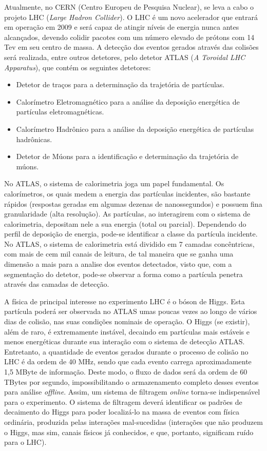 Atualmente, no CERN (Centro Europeu de Pesquisa Nuclear), se leva a cabo o projeto LHC (\emph{Large Hadron Collider}). O LHC é um novo acelerador que entrará em operação em 2009 e será capaz de atingir níveis de energia nunca antes alcançados, devendo colidir pacotes com um número elevado de prótons com 14 Tev em seu centro de massa. A detecção dos eventos gerados através das colisões será realizada, entre outros detetores, pelo detetor ATLAS (\emph{A Toroidal LHC Apparatus}), que contém os seguintes detetores:
 
\begin{itemize}

\item Detetor de traços para a determinação da trajetória de partículas.
\item Calorímetro Eletromagnético para a análise da deposição energética de partículas eletromagnéticas.
\item Calorímetro Hadrônico para a análise da deposição energética de partículas hadrônicas.
\item Detetor de Múons para a identificação e determinação da trajetória de múons.

\end{itemize}
 
No ATLAS, o sistema de calorimetria joga um papel fundamental. Os calorímetros, os quais medem a energia das partículas incidentes, são bastante rápidos (respostas geradas em algumas dezenas de nanossegundos) e possuem fina granularidade (alta resolução). As partículas, ao interagirem com o sistema de calorimetria, depositam nele a sua energia (total ou parcial). Dependendo do perfil de deposição de energia, pode-se identificar a classe da partícula incidente. No ATLAS, o sistema de calorimetria está dividido em 7 camadas concêntricas, com mais de cem mil canais de leitura, de tal maneira que se ganha uma dimensão a mais para a analise dos eventos detectados, visto que, com a segmentação do detetor, pode-se observar a forma como a partícula penetra através das camadas de detecção.

A física de principal interesse no experimento LHC é o bóson de Higgs. Esta partícula poderá ser observada no ATLAS umas poucas vezes ao longo de vários dias de colisão, nas suas condições nominais de operação. O Higgs (se existir), além de raro, é extremamente instável, decaindo em partículas mais estáveis e menos energéticas durante sua interação com o sistema de detecção ATLAS. Entretanto, a quantidade de eventos gerados durante o processo de colisão no LHC é da ordem de 40 MHz, sendo que cada evento carrega aproximadamente 1,5 MByte de informação. Deste modo, o fluxo de dados será da ordem de 60 TBytes por segundo, impossibilitando o armazenamento completo desses eventos para análise \emph{offline}. Assim, um sistema de filtragem \emph{online} torna-se indispensável para o experimento. O sistema de filtragem deverá identificar os padrões de decaimento do Higgs para poder localizá-lo na massa de eventos com física ordinária, produzida pelas interações mal-sucedidas (interações que não produzem o Higgs, mas sim, canais físicos já conhecidos, e que, portanto, significam ruído para o LHC).

